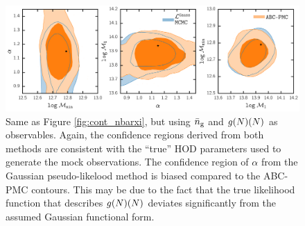 \begin{figure}
\includegraphics[width=1.\textwidth]{figures/abc/paper_ABCvsMCMC_contour_nbargmf.pdf}
\caption{\label{fig:cont_nbargmf} 
Same as Figure \ref{fig:cont_nbarxi}, but using $\bar{n}_{\mathrm{g}}$ and $g(N)(N)$ as 
observables. Again, the confidence regions derived from both methods are 
consistent with the ``true'' HOD parameters used to generate the mock 
observations. The confidence region of $\alpha$ from the Gaussian 
pseudo-likelood method is biased compared to the ABC-PMC contours. 
This may be due to the fact that the true likelihood function that 
describes $g(N)(N)$ deviates significantly from the assumed Gaussian 
functional form.}
\end{figure}




